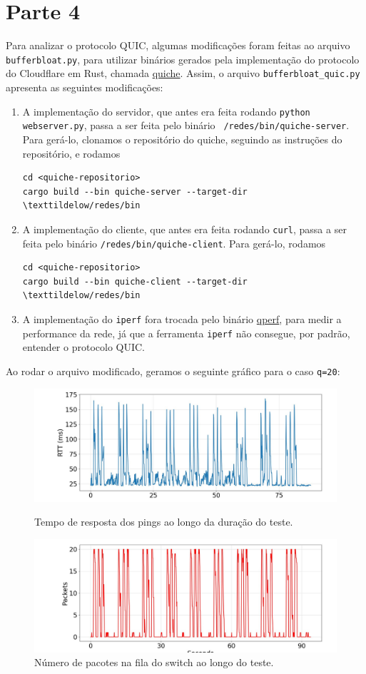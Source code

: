 \documentclass[a4paper,12pt]{article}
\newcommand{\code}[1]{\texttt{#1}}
\begin{document}
\section{Parte 4}

Para analizar o protocolo QUIC, algumas modificações foram feitas ao arquivo \code{bufferbloat.py}, para utilizar binários gerados pela implementação do protocolo do Cloudflare em Rust, chamada \href{https://github.com/cloudflare/quiche}{quiche}. Assim, o arquivo \code{bufferbloat\_quic.py} apresenta as seguintes modificações:
\begin{enumerate}
\item A implementação do servidor, que antes era feita rodando \code{python webserver.py}, passa a ser feita pelo binário \code{~/redes/bin/quiche-server}. Para gerá-lo, clonamos o repositório do quiche, seguindo as instruções do repositório, e rodamos
\begin{verbatim}
cd <quiche-repositorio>
cargo build --bin quiche-server --target-dir \texttildelow/redes/bin
\end{verbatim}
\item A implementação do cliente, que antes era feita rodando \code{curl}, passa a ser feita pelo binário \code{\texttildelow/redes/bin/quiche-client}. Para gerá-lo, rodamos 
  \begin{verbatim}
cd <quiche-repositorio>
cargo build --bin quiche-client --target-dir \texttildelow/redes/bin
\end{verbatim}
\item A implementação do \code{iperf} fora trocada pelo binário \href{https://github.com/rbruenig/qperf}{qperf}, para medir a performance da rede, já que a ferramenta \code{iperf} não consegue, por padrão, entender o protocolo QUIC.
\end{enumerate}

Ao rodar o arquivo modificado, geramos o seguinte gráfico para o caso \code{q=20}:

\begin{figure}[ht!]
  \centering
  \includegraphics[width=0.5\columnwidth]{./bufferbloat/bb-q20/quic-rtt.jpg}
  \caption{Tempo de resposta dos pings ao longo da duração do teste.}
  \includegraphics[width=0.5\columnwidth]{./bufferbloat/bb-q20/quic-buffer.jpg}
  \caption{Número de pacotes na fila do switch ao longo do teste.}
\end{figure}
\end{document}
